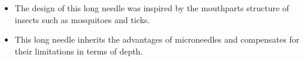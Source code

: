         \begin{itemize}
          \item The design of this long needle was inspired by the mouthparts structure of insects such as mosquitoes and ticks.
          \item This long needle inherits the advantages of microneedles and compensates for their limitations in terms of depth.
        \end{itemize}